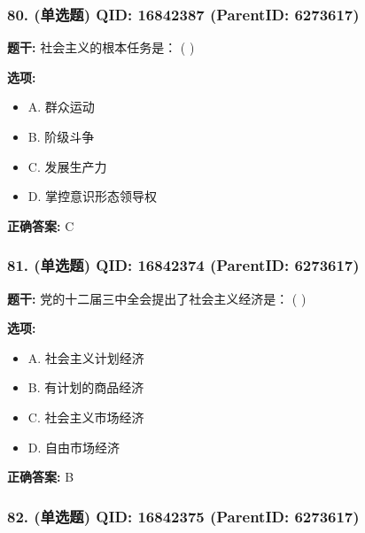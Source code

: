 \documentclass[12pt,UTF8]{ctexart}
\begin{document}
\subsubsection*{80. (单选题) \small QID: 16842387 (ParentID: 6273617)}

\textbf{题干:}
社会主义的根本任务是： ( )



\textbf{选项:}
\begin{itemize}[leftmargin=*]

  \item A. 群众运动

  \item B. 阶级斗争

  \item C. 发展生产力

  \item D. 掌控意识形态领导权

\end{itemize}

\textbf{正确答案:}
C

\vspace{0.3em}\hrulefill\vspace{0.7em}

\subsubsection*{81. (单选题) \small QID: 16842374 (ParentID: 6273617)}

\textbf{题干:}
党的十二届三中全会提出了社会主义经济是： ( )



\textbf{选项:}
\begin{itemize}[leftmargin=*]

  \item A. 社会主义计划经济

  \item B. 有计划的商品经济

  \item C. 社会主义市场经济

  \item D. 自由市场经济

\end{itemize}

\textbf{正确答案:}
B

\vspace{0.3em}\hrulefill\vspace{0.7em}

\subsubsection*{82. (单选题) \small QID: 16842375 (ParentID: 6273617)}
\end{document}

